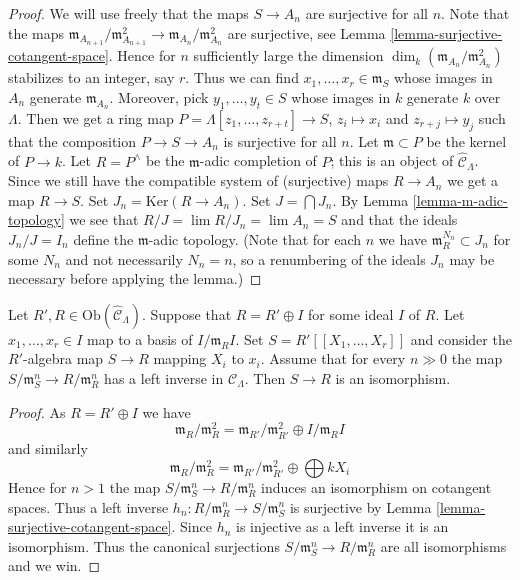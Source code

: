\begin{proof}
We will use freely that the maps $S \to A_n$ are surjective for all $n$.
Note that the maps
$\mathfrak m_{A_{n + 1}}/\mathfrak m_{A_{n + 1}}^2 \to
\mathfrak m_{A_n}/\mathfrak m_{A_n}^2$ are surjective, see
Lemma \ref{lemma-surjective-cotangent-space}.
Hence for $n$ sufficiently large the dimension
$\dim_k (\mathfrak m_{A_n}/\mathfrak m_{A_n}^2)$ stabilizes to an
integer, say $r$.
Thus we can find $x_1, \ldots, x_r \in \mathfrak m_S$ whose images in
$A_n$ generate $\mathfrak m_{A_n}$. Moreover, pick $y_1, \ldots, y_t \in S$
whose images in $k$ generate $k$ over $\Lambda$. Then we get a ring map
$P = \Lambda[z_1, \ldots, z_{r + t}] \to S$, $z_i \mapsto x_i$ and
$z_{r + j} \mapsto y_j$ such that the composition
$P \to S \to A_n$ is surjective for all $n$. Let $\mathfrak m \subset P$
be the kernel of $P \to k$. Let $R = P^\wedge$ be the $\mathfrak m$-adic
completion of $P$; this is an object of $\widehat{\mathcal{C}}_\Lambda$.
Since we still have the compatible system of (surjective) maps $R \to A_n$
we get a map $R \to S$. Set $J_n = \text{Ker}(R \to A_n)$.
Set $J = \bigcap J_n$. By
Lemma \ref{lemma-m-adic-topology}
we see that $R/J = \lim R/J_n = \lim A_n = S$ 
and that the ideals $J_n/J = I_n$ define the $\mathfrak m$-adic topology.
(Note that for each $n$ we have $\mathfrak m_R^{N_n} \subset J_n$ for
some $N_n$ and not necessarily $N_n = n$, so a renumbering of the ideals
$J_n$ may be necessary before applying the lemma.)
\end{proof}

\begin{lemma}
\label{lemma-power-series}
Let $R', R \in \text{Ob}(\widehat{\mathcal{C}}_\Lambda)$. Suppose that
$R = R' \oplus I$ for some ideal $I$ of $R$. Let $x_1, \ldots, x_r \in I$
map to a basis of $I/\mathfrak m_R I$. Set $S = R'[[X_1, \ldots, X_r]]$
and consider the $R'$-algebra map $S \to R$ mapping $X_i$ to $x_i$.
Assume that for every $n \gg 0$ the map
$S/\mathfrak m_S^n \to R/\mathfrak m_R^n$ has a left inverse in
$\mathcal{C}_\Lambda$. Then $S \to R$ is an isomorphism.
\end{lemma}

\begin{proof}
As $R = R' \oplus I$ we have
$$
\mathfrak m_R/\mathfrak m_R^2 =
\mathfrak m_{R'}/\mathfrak m_{R'}^2 \oplus I/\mathfrak m_RI
$$
and similarly
$$
\mathfrak m_R/\mathfrak m_R^2 =
\mathfrak m_{R'}/\mathfrak m_{R'}^2 \oplus \bigoplus kX_i
$$
Hence for $n > 1$ the map $S/\mathfrak m_S^n \to R/\mathfrak m_R^n$
induces an isomorphism on cotangent spaces. Thus a left inverse
$h_n : R/\mathfrak m_R^n \to S/\mathfrak m_S^n$ is surjective by
Lemma \ref{lemma-surjective-cotangent-space}.
Since $h_n$ is injective as a left inverse it is an isomorphism.
Thus the canonical surjections $S/\mathfrak m_S^n \to R/\mathfrak m_R^n$
are all isomorphisms and we win.
\end{proof}




